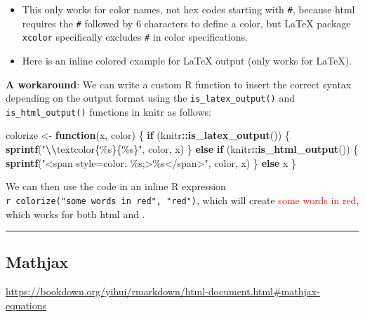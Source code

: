 \documentclass[
  a4paper,
  twoside,
  openright]{book}
\newenvironment{Shaded}{\begin{snugshade}}{\end{snugshade}}
\newcommand{\ControlFlowTok}[1]{\textcolor[rgb]{0.13,0.29,0.53}{\textbf{#1}}}
\newcommand{\FunctionTok}[1]{\textcolor[rgb]{0.13,0.29,0.53}{\textbf{#1}}}
\newcommand{\NormalTok}[1]{#1}
\newcommand{\OtherTok}[1]{\textcolor[rgb]{0.56,0.35,0.01}{#1}}
\newcommand{\SpecialCharTok}[1]{\textcolor[rgb]{0.81,0.36,0.00}{\textbf{#1}}}
\newcommand{\StringTok}[1]{\textcolor[rgb]{0.31,0.60,0.02}{#1}}
\theoremstyle{definition}
\theoremstyle{definition}
\theoremstyle{definition}
\theoremstyle{definition}
\theoremstyle{remark}
\begin{document}
\begin{itemize}
\item
  This only works for color names, not hex codes starting with \texttt{\#}, because html requires the \texttt{\#} followed by 6 characters to define a color, but LaTeX package \texttt{xcolor} specifically excludes \texttt{\#} in color specifications.
\item
  Here is an \textcolor[HTML]{00CC66}{inline colored example for LaTeX output} (only works for LaTeX).
\end{itemize}

\textbf{A workaround}: We can write a custom R function to insert the correct syntax depending on the output format using the \texttt{is\_latex\_output()} and \texttt{is\_html\_output()} functions in knitr as follows:

\begin{Shaded}
\begin{Highlighting}[]
\NormalTok{colorize }\OtherTok{\textless{}{-}} \ControlFlowTok{function}\NormalTok{(x, color) \{}
  \ControlFlowTok{if}\NormalTok{ (knitr}\SpecialCharTok{::}\FunctionTok{is\_latex\_output}\NormalTok{()) \{}
    \FunctionTok{sprintf}\NormalTok{(}\StringTok{"}\SpecialCharTok{\textbackslash{}\textbackslash{}}\StringTok{textcolor\{\%s\}\{\%s\}"}\NormalTok{, color, x)}
\NormalTok{  \} }\ControlFlowTok{else} \ControlFlowTok{if}\NormalTok{ (knitr}\SpecialCharTok{::}\FunctionTok{is\_html\_output}\NormalTok{()) \{}
    \FunctionTok{sprintf}\NormalTok{(}\StringTok{"\textless{}span style=\textquotesingle{}color: \%s;\textquotesingle{}\textgreater{}\%s\textless{}/span\textgreater{}"}\NormalTok{, color,}
\NormalTok{      x)}
\NormalTok{  \} }\ControlFlowTok{else}\NormalTok{ x}
\NormalTok{\}}
\end{Highlighting}
\end{Shaded}

We can then use the code in an inline R expression \texttt{\textasciigrave{}r\ colorize("some\ words\ in\ red",\ "red")\textasciigrave{}}, which will create \textcolor{red}{some words in red}, which works for both html and .

\begin{center}\rule{0.5\linewidth}{0.5pt}\end{center}

\subsection*{Mathjax}\label{mathjax}

\url{https://bookdown.org/yihui/rmarkdown/html-document.html\#mathjax-equations}
\end{document}

